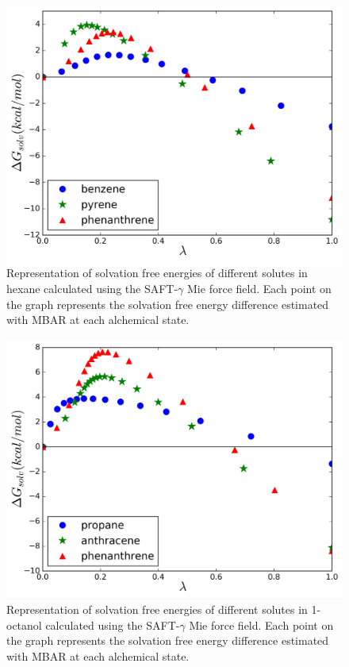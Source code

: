 \documentclass[preprint]{elsarticle}
\begin{document}
	\begin{figure}
		\centering
		\includegraphics[width=1.0\linewidth]{Figures/hexart}
		\caption{Representation of solvation free energies of different solutes in hexane calculated using the SAFT-$\gamma$ Mie force field. Each point on the graph represents the solvation free energy difference estimated with MBAR at each alchemical state.}
		\label{fig:hex}
	\end{figure}
	\begin{figure}
		\centering
		\includegraphics[width=1.0\linewidth]{Figures/octart}
		\caption{Representation of solvation free energies of different solutes in 1-octanol calculated using the SAFT-$\gamma$ Mie force field. Each point on the graph represents the solvation free energy difference estimated with MBAR at each alchemical state.}
		\label{fig:oct}
	\end{figure}
\end{document}
